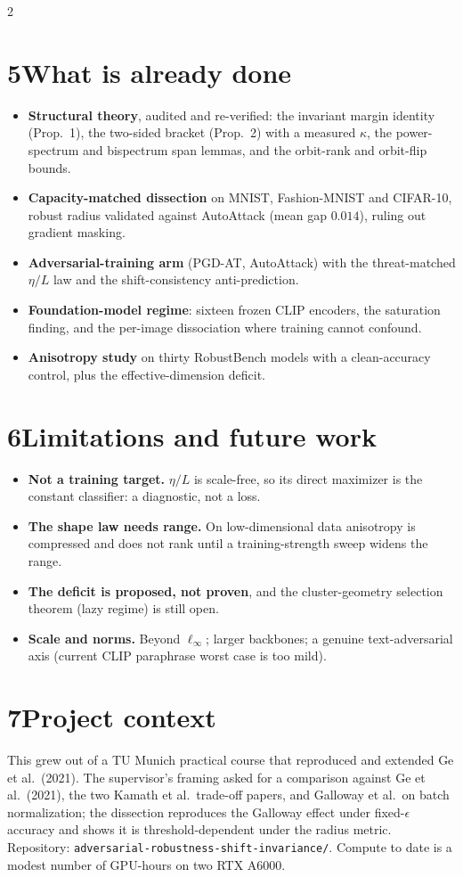 \documentclass[10pt]{article}
\newcommand{\etaL}{\ensuremath{\eta/L}}
\begin{document}
\begin{multicols}{2}
\section*{5\quad What is already done}
\begin{itemize}[leftmargin=1.05em,itemsep=1pt,topsep=2pt]
\item \textbf{Structural theory}, audited and re-verified: the invariant margin identity (Prop.~1), the two-sided bracket (Prop.~2) with a measured $\kappa$, the power-spectrum and bispectrum span lemmas, and the orbit-rank and orbit-flip bounds.
\item \textbf{Capacity-matched dissection} on MNIST, Fashion-MNIST and CIFAR-10, robust radius validated against AutoAttack (mean gap $0.014$), ruling out gradient masking.
\item \textbf{Adversarial-training arm} (PGD-AT, AutoAttack) with the threat-matched \etaL{} law and the shift-consistency anti-prediction.
\item \textbf{Foundation-model regime}: sixteen frozen CLIP encoders, the saturation finding, and the per-image dissociation where training cannot confound.
\item \textbf{Anisotropy study} on thirty RobustBench models with a clean-accuracy control, plus the effective-dimension deficit.
\end{itemize}

\section*{6\quad Limitations and future work}
\begin{itemize}[leftmargin=1.05em,itemsep=1pt,topsep=2pt]
\item \textbf{Not a training target.} \etaL{} is scale-free, so its direct maximizer is the constant classifier: a diagnostic, not a loss.
\item \textbf{The shape law needs range.} On low-dimensional data anisotropy is compressed and does not rank until a training-strength sweep widens the range.
\item \textbf{The deficit is proposed, not proven}, and the cluster-geometry selection theorem (lazy regime) is still open.
\item \textbf{Scale and norms.} Beyond $\ell_\infty$; larger backbones; a genuine text-adversarial axis (current CLIP paraphrase worst case is too mild).
\end{itemize}

\section*{7\quad Project context}
This grew out of a TU Munich practical course that reproduced and extended Ge et al.\ (2021). The supervisor's framing asked for a comparison against Ge et al.\ (2021), the two Kamath et al.\ trade-off papers, and Galloway et al.\ on batch normalization; the dissection reproduces the Galloway effect under fixed-$\epsilon$ accuracy and shows it is threshold-dependent under the radius metric. Repository: \texttt{adversarial-robustness-shift-invariance/}. Compute to date is a modest number of GPU-hours on two RTX A6000.


\end{multicols}
\end{document}
